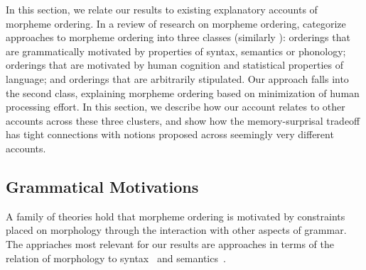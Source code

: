 \documentclass[11pt,letterpaper]{article}
\newcommand{\citep}{\parencite}
\newcommand{\citet}{\Textcite}
\newcommand\becky[1]{{\color{blue}(#1)}}
\begin{document}


In this section, we relate our results to existing explanatory accounts of morpheme ordering.
In a review of research on morpheme ordering, \citet{manova2010modeling} %
categorize approaches to morpheme ordering into three classes (similarly \citet{rice2000morpheme}): orderings that are grammatically motivated by properties of syntax, semantics or phonology; orderings that are motivated by human cognition and statistical properties of language; and orderings that are arbitrarily stipulated.
Our approach falls into the second class, explaining morpheme ordering based on minimization of human processing effort.
In this section, we describe how our account relates to other accounts across these three clusters, and show how the memory-surprisal tradeoff has tight connections with notions proposed across seemingly very different accounts.





\subsection{Grammatical Motivations}

A family of theories hold that morpheme ordering is motivated by constraints placed on morphology through the interaction with other aspects of grammar.
The appriaches most relevant for our results are approaches in terms of the relation of morphology to syntax~\citep{baker1985the} and semantics~\citep{bybee-morphology-1985,rice2000morpheme}.



\end{document}
